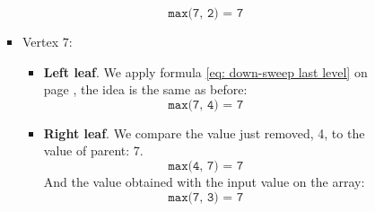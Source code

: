 \begin{itemize}
\begin{itemize}
\begin{enumerate}
\begin{examplebox}
\begin{enumerate}
\begin{itemize}
\begin{itemize}
\begin{equation*}
                                \texttt{max(7, 2) = 7}
                            \end{equation*}
                        \end{itemize}
                        \newpage
                        \item Vertex $7$:
                        \begin{itemize}
                            \item \textbf{Left leaf}. We apply formula \ref{eq: down-sweep last level} on page \pageref{eq: down-sweep last level}, the idea is the same as before:
                            \begin{equation*}
                                \texttt{max(7, 4) = 7}
                            \end{equation*}
                            \item \textbf{Right leaf}. We compare the value just removed, 4, to the value of parent: 7.
                            \begin{equation*}
                                \texttt{max(4, 7) = 7}
                            \end{equation*}
                            And the value obtained with the input value on the array:
                            \begin{equation*}
                                \texttt{max(7, 3) = 7}
                            \end{equation*}
                        \end{itemize}
                    \end{itemize}
                    \begin{center}
                        \begin{tikzpicture}
                            [level distance=14mm,
                             level 1/.style={sibling distance=40mm},
                             level 2/.style={sibling distance=20mm},
                             level 3/.style={sibling distance=10mm},
                             every node/.style={draw, circle, minimum size=8mm, inner sep=0pt},
                             edge from parent/.style={draw, -{Stealth}}]
    

\end{tikzpicture}
\end{center}
\end{enumerate}
\end{examplebox}
\end{enumerate}
\end{itemize}
\end{itemize}
